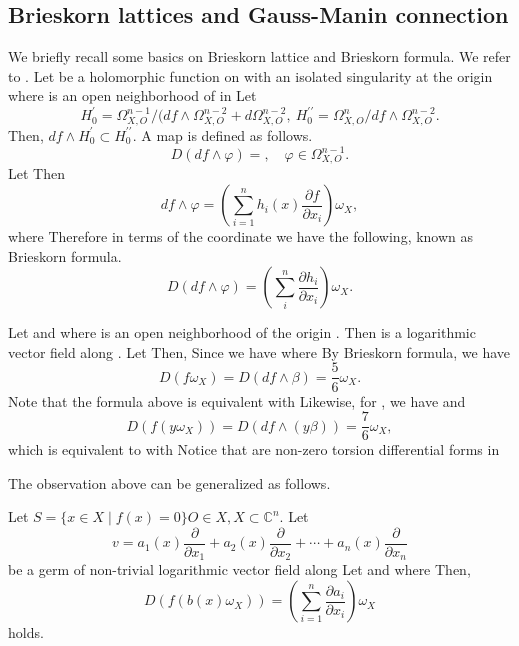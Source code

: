\documentclass{arxsigma}
\begin{document}
\subsection{Brieskorn lattices and Gauss-Manin connection}
We briefly recall some basics on Brieskorn lattice and Brieskorn formula. We refer to \cite{BS, Br, Schu}.
Let   be a holomorphic function on   with an isolated singularity at the origin   where   is an open neighborhood of   in  
Let
\begin{equation*}
H_{0}^{\prime} = \Omega_{X, O}^{n-1}/(df \wedge \Omega_{X,O}^{n-2} + d \Omega_{X,O}^{n-2}, \ H_{0}^{\prime\prime}=\Omega_{X,O}^{n}/df \wedge \Omega_{X,O}^{n-2}.
\end{equation*}
Then, $df \wedge
H_{0}^{\prime} \subset H_{0}^{\prime\prime}. $
A map   is defined as follows.
\begin{equation*}
D(df \wedge \varphi) = , \quad \varphi \in \Omega_{X,O}^{n-1}.
\end{equation*}
Let   Then
\begin{equation*}
df \wedge \varphi = \left(\sum_{i=1}^{n} h_i(x)\frac{\partial f}{\partial x_i}\right) \omega_X,
\end{equation*}
where   Therefore
in terms of the coordinate we have the following, known as Brieskorn formula.
\begin{equation*}
D(df\wedge \varphi) = \left(\sum_{i}^{n} \frac{\partial h_i}{\partial x_i}\right)\omega_X. \end{equation*}
\begin{example}
Let  and   where   is an open neighborhood of the origin  . Then   is a logarithmic vector field along  .
Let   Then,  
Since   we have   where  
By Brieskorn formula, we have
\begin{equation*}
D(f\omega_X) = D(df \wedge \beta) =\dfrac{5}{6}\omega_X.
\end{equation*}
Note that the formula above is equivalent   with  
Likewise, for  , we have   and
\begin{equation*}
D(f(y\omega_X)) = D(df \wedge (y\beta)) = \dfrac{7}{6}\omega_X,
\end{equation*}
which is equivalent to
  with  
Notice that   are non-zero torsion differential forms in  
\end{example}
The observation above can be generalized as follows.
\begin{proposition}
Let $ S=\{x
\in X \mid f(x)=0 \}  O \in X,   X \subset{\mathbb C}^n. $ Let
\begin{equation*}
v=a_1(x)\frac{\partial}{\partial x_1} + a_2(x)\frac{\partial}{\partial x_2}+ \cdots +a_n(x)\frac{\partial}{\partial x_n}
\end{equation*}
be a germ of
non-trivial logarithmic vector field along  
Let
  and   where  
Then,
\begin{equation*}
D(f(b(x)\omega_X)) = \left( \sum_{i=1}^{n} \frac{\partial a_i}{\partial x_i} \right) \omega_X
\end{equation*}
holds.
\end{proposition}
\end{document}
